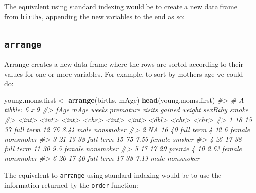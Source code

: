 \documentclass[]{book}
\newenvironment{Shaded}{\begin{snugshade}}{\end{snugshade}}
\newcommand{\CommentTok}[1]{\textcolor[rgb]{0.56,0.35,0.01}{\textit{#1}}}
\newcommand{\DataTypeTok}[1]{\textcolor[rgb]{0.13,0.29,0.53}{#1}}
\newcommand{\FloatTok}[1]{\textcolor[rgb]{0.00,0.00,0.81}{#1}}
\newcommand{\KeywordTok}[1]{\textcolor[rgb]{0.13,0.29,0.53}{\textbf{#1}}}
\newcommand{\NormalTok}[1]{#1}
\newcommand{\OperatorTok}[1]{\textcolor[rgb]{0.81,0.36,0.00}{\textbf{#1}}}
\newcommand{\StringTok}[1]{\textcolor[rgb]{0.31,0.60,0.02}{#1}}
\theoremstyle{definition}
\theoremstyle{definition}
\theoremstyle{definition}
\theoremstyle{remark}
\begin{document}
The equivalent using standard indexing would be to create a new data
frame from \texttt{births}, appending the new variables to the end as
so:

\begin{Shaded}
\end{Shaded}

\hypertarget{arrange}{%
\subsection{\texorpdfstring{\texttt{arrange}}{arrange}}\label{arrange}}

Arrange creates a new data frame where the rows are sorted according to
their values for one or more variables. For example, to sort by mothers
age we could do:

\begin{Shaded}
\begin{Highlighting}[]
\NormalTok{young.moms.first <-}\StringTok{ }\KeywordTok{arrange}\NormalTok{(births, mAge)}
\KeywordTok{head}\NormalTok{(young.moms.first)}
\CommentTok{#> # A tibble: 6 x 9}
\CommentTok{#>    fAge  mAge weeks premature visits gained weight sexBaby smoke    }
\CommentTok{#>   <int> <int> <int> <chr>      <int>  <int>  <dbl> <chr>   <chr>    }
\CommentTok{#> 1    18    15    37 full term     12     76   8.44 male    nonsmoker}
\CommentTok{#> 2    NA    16    40 full term      4     12   6    female  nonsmoker}
\CommentTok{#> 3    21    16    38 full term     15     75   7.56 female  smoker   }
\CommentTok{#> 4    26    17    38 full term     11     30   9.5  female  nonsmoker}
\CommentTok{#> 5    17    17    29 premie         4     10   2.63 female  nonsmoker}
\CommentTok{#> 6    20    17    40 full term     17     38   7.19 male    nonsmoker}
\end{Highlighting}
\end{Shaded}

The equivalent to \texttt{arrange} using standard indexing would be to
use the information returned by the \texttt{order} function:
\end{document}

